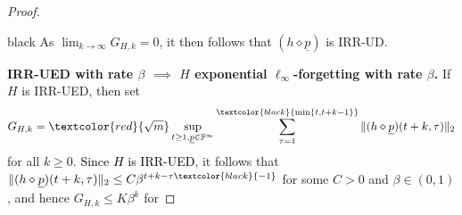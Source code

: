 \documentclass[journal,twoside,web]{ieeecolor}
\begin{document}
\begin{proof}
\begin{color}{black}
         As $\lim_{k \rightarrow \infty} G_{H,k}=0$,
         it then follows that $(h \diamond \underline{p})$ is IRR-UD. 
        \end{color}
    \textbf{IRR-UED with rate $\beta$ $\implies$ $H$ exponential $\ell_{\infty}$-forgetting with rate $\beta$.}
         If $H$ is IRR-UED, then set %
         \[
		 G_{H,k}=\textcolor{red}{\sqrt{m}}\sup_{t \ge 1, \underline{p} \in \mathbb{P}^{\infty}} \sum_{\tau=1}^{\textcolor{black}{\min\{t,t+k-1\}}} \|(h \diamond \underline{p})(t+k,\tau)\|_2
         \]
         for all $k \ge 0$.
         \textcolor{black}{Since $H$ is IRR-UED}, it follows that 
         $\|(h \diamond \underline{p})(t+k,\tau)\|_2 \le C \beta^{t+k-\tau\textcolor{black}{-1}}$ for some $C > 0$ and $\beta \in (0,1)$, and hence $G_{H,k} \le K\beta^k$ for 

\end{proof}
\end{document}
